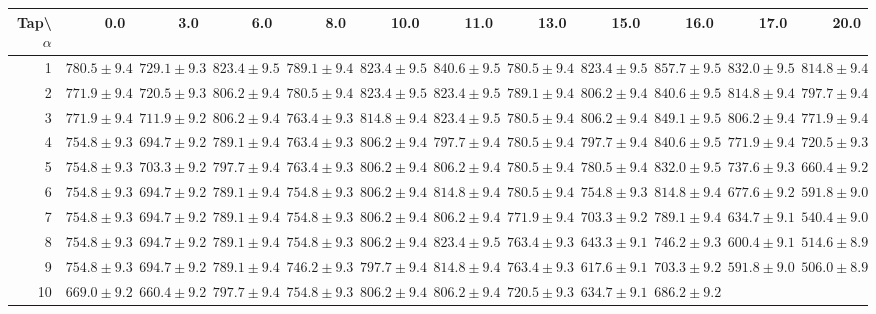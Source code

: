 \documentclass[runningheads]{llncs}
\begin{document}
\begin{table}
\begin{center}
\begin{tabular}{rrrrrrrrrrrr}
\toprule
{}Tap\textbackslash$\alpha$ &           0.0  &           3.0  &           6.0  &           8.0  &           10.0 &           11.0 &           13.0 &           15.0 &           16.0 & 
          17.0 &           20.0 \\
\midrule
1  &  $780.5\pm9.4$ &  $729.1\pm9.3$ &  $823.4\pm9.5$ &  $789.1\pm9.4$ &  $823.4\pm9.5$ &  $840.6\pm9.5$ &  $780.5\pm9.4$ &  $823.4\pm9.5$ &  $857.7\pm9.5$ & 
 $832.0\pm9.5$ &  $814.8\pm9.4$ \\
2  &  $771.9\pm9.4$ &  $720.5\pm9.3$ &  $806.2\pm9.4$ &  $780.5\pm9.4$ &  $823.4\pm9.5$ &  $823.4\pm9.5$ &  $789.1\pm9.4$ &  $806.2\pm9.4$ &  $840.6\pm9.5$ & 
 $814.8\pm9.4$ &  $797.7\pm9.4$ \\
3  &  $771.9\pm9.4$ &  $711.9\pm9.2$ &  $806.2\pm9.4$ &  $763.4\pm9.3$ &  $814.8\pm9.4$ &  $823.4\pm9.5$ &  $780.5\pm9.4$ &  $806.2\pm9.4$ &  $849.1\pm9.5$ & 
 $806.2\pm9.4$ &  $771.9\pm9.4$ \\
4  &  $754.8\pm9.3$ &  $694.7\pm9.2$ &  $789.1\pm9.4$ &  $763.4\pm9.3$ &  $806.2\pm9.4$ &  $797.7\pm9.4$ &  $780.5\pm9.4$ &  $797.7\pm9.4$ &  $840.6\pm9.5$ & 
 $771.9\pm9.4$ &  $720.5\pm9.3$ \\
5  &  $754.8\pm9.3$ &  $703.3\pm9.2$ &  $797.7\pm9.4$ &  $763.4\pm9.3$ &  $806.2\pm9.4$ &  $806.2\pm9.4$ &  $780.5\pm9.4$ &  $780.5\pm9.4$ &  $832.0\pm9.5$ & 
 $737.6\pm9.3$ &  $660.4\pm9.2$ \\
6  &  $754.8\pm9.3$ &  $694.7\pm9.2$ &  $789.1\pm9.4$ &  $754.8\pm9.3$ &  $806.2\pm9.4$ &  $814.8\pm9.4$ &  $780.5\pm9.4$ &  $754.8\pm9.3$ &  $814.8\pm9.4$ & 
 $677.6\pm9.2$ &  $591.8\pm9.0$ \\
7  &  $754.8\pm9.3$ &  $694.7\pm9.2$ &  $789.1\pm9.4$ &  $754.8\pm9.3$ &  $806.2\pm9.4$ &  $806.2\pm9.4$ &  $771.9\pm9.4$ &  $703.3\pm9.2$ &  $789.1\pm9.4$ & 
 $634.7\pm9.1$ &  $540.4\pm9.0$ \\
8  &  $754.8\pm9.3$ &  $694.7\pm9.2$ &  $789.1\pm9.4$ &  $754.8\pm9.3$ &  $806.2\pm9.4$ &  $823.4\pm9.5$ &  $763.4\pm9.3$ &  $643.3\pm9.1$ &  $746.2\pm9.3$ & 
 $600.4\pm9.1$ &  $514.6\pm8.9$ \\
9  &  $754.8\pm9.3$ &  $694.7\pm9.2$ &  $789.1\pm9.4$ &  $746.2\pm9.3$ &  $797.7\pm9.4$ &  $814.8\pm9.4$ &  $763.4\pm9.3$ &  $617.6\pm9.1$ &  $703.3\pm9.2$ & 
 $591.8\pm9.0$ &  $506.0\pm8.9$ \\
10 &  $669.0\pm9.2$ &  $660.4\pm9.2$ &  $797.7\pm9.4$ &  $754.8\pm9.3$ &  $806.2\pm9.4$ &  $806.2\pm9.4$ &  $720.5\pm9.3$ &  $634.7\pm9.1$ &  $686.2\pm9.2$ & 

\end{tabular}
\end{center}
\end{table}
\end{document}
